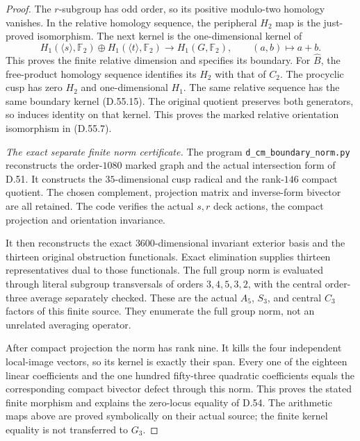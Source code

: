 \begin{proof}
The \(r\)-subgroup has odd order,
so its positive modulo-two homology
vanishes. In the relative homology
sequence, the peripheral \(H_2\)
map is the just-proved isomorphism.
The next kernel is the one-dimensional
kernel of
\[
 H_1(\langle s\rangle,\mathbb F_2)
  \oplus H_1(\langle t\rangle,\mathbb F_2)
       \longrightarrow H_1(G,\mathbb F_2),
       \qquad(a,b)\longmapsto a+b .
 \tag{D.55.15}
\]
This proves the finite relative
dimension and specifies its boundary.
For \(\widehat B\), the free-product
homology sequence identifies its
\(H_2\) with that of \(C_2\).
The procyclic cusp has zero \(H_2\)
and one-dimensional \(H_1\).
The same relative sequence has the
same boundary kernel (D.55.15).
The original quotient preserves
both generators, so induces identity
on that kernel. This proves the
marked relative orientation
isomorphism in (D.55.7).

\emph{The exact separate finite norm certificate.}
The program
\texttt{d\_cm\_boundary\_norm.py}
reconstructs the order-\(1080\)
marked graph and the actual
intersection form of D.51.
It constructs the \(35\)-dimensional
cusp radical and the rank-\(146\)
compact quotient.
The chosen complement, projection
matrix and inverse-form bivector
are all retained. The code verifies
the actual \(s,r\) deck actions,
the compact projection and
orientation invariance.

It then reconstructs the exact
\(3600\)-dimensional invariant
exterior basis and the thirteen
original obstruction functionals.
Exact elimination supplies thirteen
representatives dual to those
functionals. The full group norm
is evaluated through literal
subgroup transversals of orders
\(3,4,5,3,2\), with the central
order-three average separately
checked. These are the actual
\(A_5\), \(S_3\), and central
\(C_3\) factors of this finite
source. They enumerate the full
group norm, not an unrelated
averaging operator.

After compact projection the norm
has rank nine. It kills the four
independent local-image vectors,
so its kernel is exactly their
span. Every one of the eighteen
linear coefficients and the
one hundred fifty-three quadratic
coefficients equals the corresponding
compact bivector defect through
this norm. This proves the stated
finite morphism and explains the
zero-locus equality of D.54.
The arithmetic maps above are
proved symbolically on their actual
source; the finite kernel equality
is not transferred to \(G_3\).
\end{proof}
